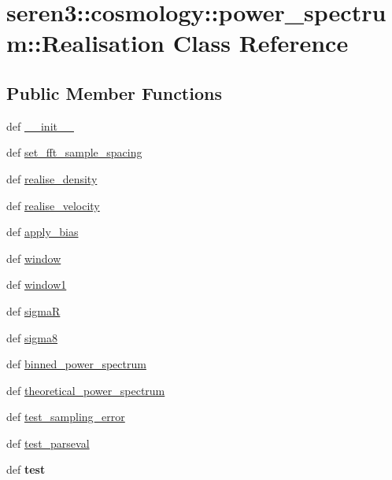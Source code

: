 \hypertarget{classseren3_1_1cosmology_1_1power__spectrum_1_1Realisation}{
\section{seren3::cosmology::power\_\-spectrum::Realisation Class Reference}
\label{classseren3_1_1cosmology_1_1power__spectrum_1_1Realisation}
}
\subsection*{Public Member Functions}
\begin{DoxyCompactItemize}
\item 
def \hyperlink{classseren3_1_1cosmology_1_1power__spectrum_1_1Realisation_a66657479f264e864519470d5cca27da3}{\_\-\_\-init\_\-\_\-}
\item 
def \hyperlink{classseren3_1_1cosmology_1_1power__spectrum_1_1Realisation_a70cae5b4e147c06dda4f195bf11876a2}{set\_\-fft\_\-sample\_\-spacing}
\item 
def \hyperlink{classseren3_1_1cosmology_1_1power__spectrum_1_1Realisation_a2d7f743d7a8bad924187e6f9fe379417}{realise\_\-density}
\item 
def \hyperlink{classseren3_1_1cosmology_1_1power__spectrum_1_1Realisation_a0e1f42e5de6f6d530735c8fe79529dd1}{realise\_\-velocity}
\item 
def \hyperlink{classseren3_1_1cosmology_1_1power__spectrum_1_1Realisation_a9ba2161fc48fe4a8588f84e62e668dc0}{apply\_\-bias}
\item 
def \hyperlink{classseren3_1_1cosmology_1_1power__spectrum_1_1Realisation_ae1949bbd25d64f3e15751e4f78bf845d}{window}
\item 
def \hyperlink{classseren3_1_1cosmology_1_1power__spectrum_1_1Realisation_aba11124fa5b26227a07e4daa0413405a}{window1}
\item 
def \hyperlink{classseren3_1_1cosmology_1_1power__spectrum_1_1Realisation_a7aa3738c4f9874c56702655c77463f98}{sigmaR}
\item 
def \hyperlink{classseren3_1_1cosmology_1_1power__spectrum_1_1Realisation_a11401db5e3772aed682363e17a0bf8d8}{sigma8}
\item 
def \hyperlink{classseren3_1_1cosmology_1_1power__spectrum_1_1Realisation_a2ae0cbfd6b3781bf57b2b89188fc7cad}{binned\_\-power\_\-spectrum}
\item 
def \hyperlink{classseren3_1_1cosmology_1_1power__spectrum_1_1Realisation_a02f12b743f326436bd4b9a482e6f0596}{theoretical\_\-power\_\-spectrum}
\item 
def \hyperlink{classseren3_1_1cosmology_1_1power__spectrum_1_1Realisation_a5db10734093eab1e21e2e1162375ec65}{test\_\-sampling\_\-error}
\item 
def \hyperlink{classseren3_1_1cosmology_1_1power__spectrum_1_1Realisation_a3fa53f286013d68966617cb9b360e4bf}{test\_\-parseval}
\item 
\hypertarget{classseren3_1_1cosmology_1_1power__spectrum_1_1Realisation_a7ff9f2220ce9615f30667a7b49935a88}{
def {\bfseries test}}
\label{classseren3_1_1cosmology_1_1power__spectrum_1_1Realisation_a7ff9f2220ce9615f30667a7b49935a88}


\end{DoxyCompactItemize}
